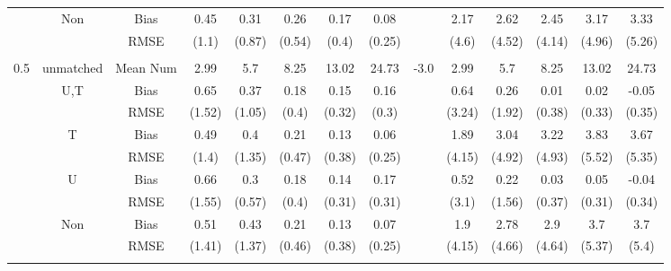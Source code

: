 \begin{tabular}{@{\extracolsep{5pt}}lc|cccccc|lccccc}
 & Non & Bias & 0.45 & 0.31 & 0.26 & 0.17 & 0.08 &  & 2.17 & 2.62 & 2.45 & 3.17 & 3.33 \\
 &  & RMSE & (1.1) & (0.87) & (0.54) & (0.4) & (0.25) &  & (4.6) & (4.52) & (4.14) & (4.96) & (5.26) \\
 &  &  &  &  &  &  &  &  &  &  &  &  &  \\
0.5 & unmatched & Mean Num & 2.99 & 5.7 & 8.25 & 13.02 & 24.73 & -3.0 & 2.99 & 5.7 & 8.25 & 13.02 & 24.73 \\
 & U,T & Bias & 0.65 & 0.37 & 0.18 & 0.15 & 0.16 &  & 0.64 & 0.26 & 0.01 & 0.02 & -0.05 \\
 &  & RMSE & (1.52) & (1.05) & (0.4) & (0.32) & (0.3) &  & (3.24) & (1.92) & (0.38) & (0.33) & (0.35) \\
 & T & Bias & 0.49 & 0.4 & 0.21 & 0.13 & 0.06 &  & 1.89 & 3.04 & 3.22 & 3.83 & 3.67 \\
 &  & RMSE & (1.4) & (1.35) & (0.47) & (0.38) & (0.25) &  & (4.15) & (4.92) & (4.93) & (5.52) & (5.35) \\
 & U & Bias & 0.66 & 0.3 & 0.18 & 0.14 & 0.17 &  & 0.52 & 0.22 & 0.03 & 0.05 & -0.04 \\
 &  & RMSE & (1.55) & (0.57) & (0.4) & (0.31) & (0.31) &  & (3.1) & (1.56) & (0.37) & (0.31) & (0.34) \\
 & Non & Bias & 0.51 & 0.43 & 0.21 & 0.13 & 0.07 &  & 1.9 & 2.78 & 2.9 & 3.7 & 3.7 \\
 &  & RMSE & (1.41) & (1.37) & (0.46) & (0.38) & (0.25) &  & (4.15) & (4.66) & (4.64) & (5.37) & (5.4) \\
 &  &  &  &  &  &  &  &  &  &  &  &  &  \\
\hline 
\bottomrule 
\end{tabular}
